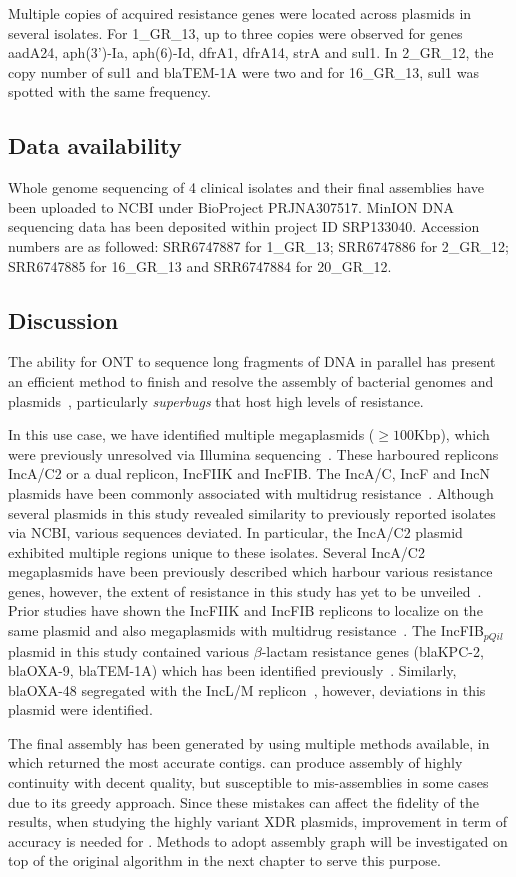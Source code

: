 Multiple copies of acquired resistance genes were located across plasmids in several isolates. For 1\_GR\_13, up to three copies were observed for genes aadA24, aph(3')-Ia, aph(6)-Id, dfrA1, dfrA14, strA and sul1. In 2\_GR\_12, the copy number of sul1 and blaTEM-1A were two and for 16\_GR\_13, sul1 was spotted with the same frequency.

\subsection{Data availability}
Whole genome sequencing of 4 clinical isolates and their final assemblies have been uploaded to NCBI under BioProject PRJNA307517.
MinION DNA sequencing data has been deposited within project ID SRP133040. 
Accession numbers are as followed: SRR6747887 for 1\_GR\_13; SRR6747886 for 2\_GR\_12; SRR6747885 for 16\_GR\_13 and SRR6747884 for 20\_GR\_12.

\subsection{Discussion}
The ability for ONT to sequence long fragments of DNA in parallel has present an efficient method to finish  and resolve the assembly of bacterial genomes and plasmids~\cite{Cao2017scaffolding,Wick2017M12}, particularly \emph{superbugs} that host high levels of resistance. 

In this use case, we have identified multiple megaplasmids ($\geq 100$Kbp), which were previously unresolved via Illumina sequencing~\cite{Miranda2018}. These harboured replicons IncA/C2 or a dual replicon, IncFIIK and IncFIB. 
The IncA/C, IncF and IncN plasmids have been commonly associated with multidrug resistance~\cite{Carattoli2009M34}. 
Although several plasmids in this study revealed similarity to previously reported isolates via NCBI, various sequences deviated. 
In particular, the IncA/C2 plasmid exhibited multiple regions unique to these isolates. 
Several IncA/C2 megaplasmids have been previously described which harbour various resistance genes, however, the extent of resistance in this study has yet to be unveiled~\cite{Desmet2018M35,Papagiannitsis2016cM36}. 
Prior studies have shown the IncFIIK and IncFIB replicons to localize on the same plasmid and also megaplasmids with multidrug resistance~\cite{Navon2017M6}. 
The IncFIB$_{pQil}$ plasmid in this study contained various $\beta$-lactam resistance genes (blaKPC-2, blaOXA-9, blaTEM-1A) which has been identified previously~\cite{Chen2014M37}. Similarly, blaOXA-48 segregated with the IncL/M replicon~\cite{Poirel2012M38,Potron2014M39}, however, deviations in this plasmid were identified.

The final assembly has been generated by using multiple methods available, in which \unicycler{} returned the most accurate contigs. \npscarf{} can produce assembly of highly continuity with decent quality, but susceptible to mis-assemblies in some cases due to its greedy approach. Since  these mistakes can affect the fidelity of the results, \EG{} when studying the highly variant XDR plasmids, improvement in term of accuracy is needed for \npscarf{}. Methods to adopt assembly graph will be investigated on top of the original algorithm in the next chapter to serve this purpose. 
